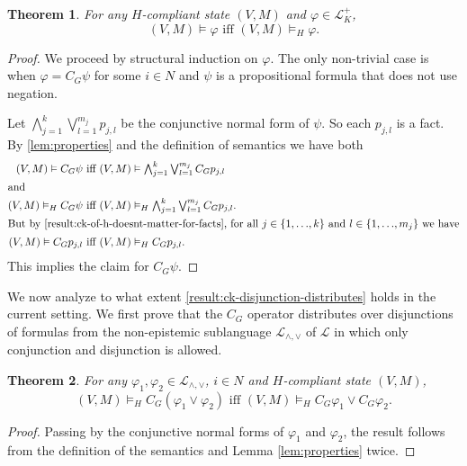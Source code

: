 \documentclass{article}
\newcounter{#1}
\newtheorem{theorem}{Theorem}[section]
\newcommand{\LL}{\mbox{$\ldots$}}
\newcommand{\state}[1][]{\ensuremath{(V#1,M#1)}\xspace}
\newcommand{\ck}[1]{\ensuremath{C_{#1}}\xspace}\newcommand{\Facts}{\mathit{Facts}}
\renewcommand{\iff}{\text{ iff }}
\renewcommand{\enspace}{}
\begin{document}
\begin{theorem}
  \label{thm:+K}
  For any $H$-compliant state $\state$ and $\varphi\in\mathcal{L}^+_{K}$,
\[
\mbox{$\state\vDash\varphi$ iff $\state\vDash_H\varphi$.}
\]
\end{theorem}
\begin{proof} 
  We proceed by structural induction on $\varphi$.  The only
  non-trivial case is when $\varphi=\ck G\psi$ for some $i\in N$ and
  $\psi$ is a propositional formula that does not use negation.

Let $\bigwedge_{j=1}^{k} \bigvee_{l=1}^{m_j} p_{j,l}$
be the conjunctive normal form of $\psi$. So each $p_{j,l}$ is a fact.
By \cref{lem:properties} and the definition of semantics
we have both
\begin{align*}
  \state\vDash \ck G \psi&\iff\state\vDash\textstyle\bigwedge_{j=1}^{k} \bigvee_{l=1}^{m_j} \ck G p_{j,l}\\
  \intertext{and}
  \state\vDash_H \ck G \psi&\iff\state\vDash_H\textstyle\bigwedge_{j=1}^{k} \bigvee_{l=1}^{m_j} \ck G p_{j,l}\enspace.\\
  \intertext{But by \cref{result:ck-of-h-doesnt-matter-for-facts}, for all $j \in \C{1, \LL, k}$ and $l \in \C{1, \LL, m_j}$ we have}
  \state\vDash \ck G p_{j,l}&\iff\state\vDash_H \ck G p_{j,l}\enspace.
\end{align*}
This implies the claim for $\ck G\psi$.
\end{proof}

We now analyze to what extent \cref{result:ck-disjunction-distributes} holds in the current setting.
We first prove that the $\ck G$ operator distributes over
disjunctions of formulas from the non-epistemic sublanguage
$\mathcal{L}_{\wedge,\vee}$ of $\mathcal{L}$ in which only
conjunction and disjunction is allowed.

\begin{theorem}
  \label{thm:disj-p}
  For any $\varphi_1,\varphi_2\in\mathcal{L}_{\wedge,\vee}$, $i\in N$ and $H$-compliant state $\state$,
  \[
  \mbox{$\state \vDash_H \ck G(\varphi_1\vee\varphi_2)$ iff $\state \vDash_H \ck G\varphi_1\vee \ck G\varphi_2$.}
  \]
\end{theorem}
\begin{proof}
Passing by the conjunctive normal forms of $\varphi_1$ and $\varphi_2$,
the result follows from the definition of the semantics and Lemma \ref{lem:properties} twice.
\end{proof}
\end{document}
